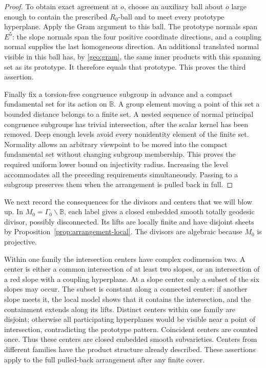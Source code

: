 \documentclass[11pt,reqno]{amsart}
\numberwithin{equation}{section}
\theoremstyle{definition}
\theoremstyle{remark}
\newcommand{\BB}{\mathbb B}
\begin{document}
\begin{proof}
To obtain exact agreement at $o$, choose an auxiliary ball about $o$
large enough to contain the prescribed $R_0$-ball and to meet every
prototype hyperplane.  Apply the Gram argument to this ball.  The
prototype normals span $E^5$: the slope normals span the four positive
coordinate directions, and a coupling normal supplies the last
homogeneous direction.  An additional translated normal visible in
this ball has, by \eqref{geo:gram}, the same inner products with this
spanning set as its prototype.  It therefore equals that prototype.
This proves the third assertion.

Finally fix a torsion-free congruence subgroup in advance and a compact
fundamental set for its action on $\BB$.  A group element moving a point
of this set a bounded distance belongs to a finite set.  A nested
sequence of normal principal congruence subgroups has trivial
intersection, after the scalar kernel has been removed.  Deep enough
levels avoid every nonidentity element of the finite set.  Normality
allows an arbitrary viewpoint to be moved into the compact fundamental
set without changing subgroup membership.  This proves the required
uniform lower bound on injectivity radius.  Increasing the level
accommodates all the preceding requirements simultaneously.  Passing
to a subgroup preserves them when the arrangement is pulled back in
full.
\end{proof}

We next record the consequences for the divisors and centers that we
will blow up.  In $M_0=\Gamma_0\backslash\BB$, each label gives a closed
embedded smooth totally geodesic divisor, possibly disconnected.  Its
lifts are locally finite and have disjoint sheets by
Proposition~\ref{prop:arrangement-local}.  The divisors are algebraic
because $M_0$ is projective.

Within one family the intersection centers have complex codimension
two.  A center is either a common intersection of at least two slopes,
or an intersection of a red slope with a coupling hyperplane.  At a
slope center only a subset of the six slopes may occur.  The subset is
constant along a connected center: if another slope meets it, the
local model shows that it contains the intersection, and the
containment extends along its lifts.  Distinct centers within one
family are disjoint; otherwise all participating hyperplanes would be
visible near a point of intersection, contradicting the prototype
pattern.  Coincident centers are counted once.  Thus these centers are
closed embedded smooth subvarieties.  Centers from different families
have the product structure already described.  These assertions apply
to the full pulled-back arrangement after any finite cover.
\end{document}
